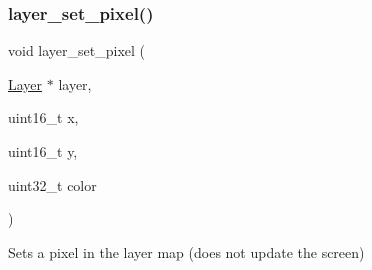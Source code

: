 \subsubsection{\texorpdfstring{layer\+\_\+set\+\_\+pixel()}{layer\_set\_pixel()}}
{\footnotesize\ttfamily void layer\+\_\+set\+\_\+pixel (\begin{DoxyParamCaption}\item[{\mbox{\hyperlink{struct_layer}{Layer}} $\ast$}]{layer,  }\item[{uint16\+\_\+t}]{x,  }\item[{uint16\+\_\+t}]{y,  }\item[{uint32\+\_\+t}]{color }\end{DoxyParamCaption})}



Sets a pixel in the layer map (does not update the screen) 


